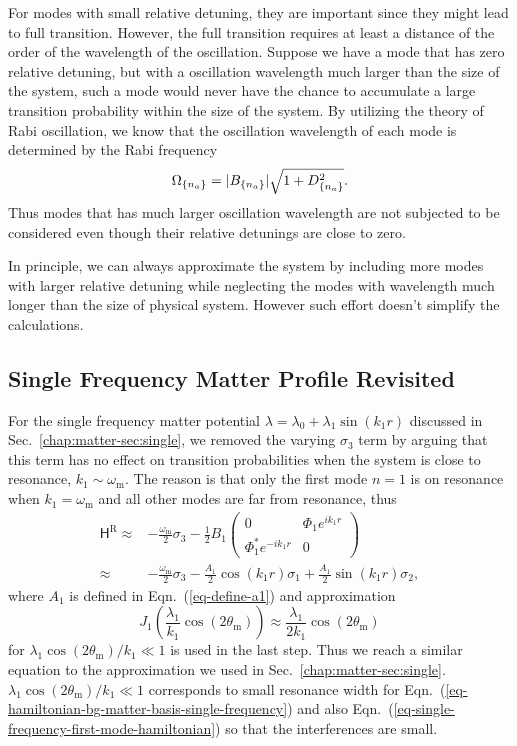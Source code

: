 For modes with small relative detuning, they are important since they might lead to full transition. However, the full transition requires at least a distance of the order of the wavelength of the oscillation. Suppose we have a mode that has zero relative detuning, but with a oscillation wavelength much larger than the size of the system, such a mode would never have the chance to accumulate a large transition probability within the size of the system. By utilizing the theory of Rabi oscillation, we know that the oscillation wavelength of each mode is determined by the Rabi frequency
\begin{equation}
\Omega_{\{n_a\}} = \lvert B_{\{n_a\}} \rvert \sqrt{1+D_{\{n_a\}}^2}.
\end{equation}
Thus modes that has much larger oscillation wavelength are not subjected to be considered even though their relative detunings are close to zero.

In principle, we can always approximate the system by including more modes with larger relative detuning while neglecting the modes with wavelength much longer than the size of physical system. However such effort doesn't simplify the calculations.


\subsection{\label{sec:single-revisted}Single Frequency Matter Profile Revisited}

For the single frequency matter potential $\lambda = \lambda_0 + \lambda_1 \sin(k_1 r)$ discussed in Sec.~\ref{chap:matter-sec:single}, we removed the varying $\sigma_3$ term by arguing that this term has no effect on transition probabilities when the system is close to resonance, $k_1 \sim \omega_{\mathrm m}$. The reason is that only the first mode $n=1$ is on resonance when $k_1=\omega_{\mathrm m}$ and all other modes are far from resonance, thus
\begin{align}
\mathsf H^{\mathrm R} \approx & -\frac{\omega_{\mathrm m}}{2}\sigma_3 - \frac{1}{2} B_1 \begin{pmatrix}
0 & \Phi_1 e^{i k_1 r} \\
\Phi_1^* e^{-ik_1r} & 0
\end{pmatrix}\label{eq-single-frequency-first-mode-hamiltonian} \\
\approx & -\frac{\omega_{\mathrm m}}{2} \sigma_3 - \frac{A_1}{2} \cos(k_1 r) \sigma_1 + \frac{A_1}{2} \sin(k_1 r) \sigma_2\nonumber,
\end{align}
where $A_1$ is defined in Eqn.~(\ref{eq-define-a1}) and approximation
\begin{equation*}
J_1\left( \frac{\lambda_1}{k_1}\cos (2\theta_{\mathrm m}) \right) \approx \frac{\lambda_1}{2k_1}\cos (2\theta_{\mathrm m})
\end{equation*}
for $\lambda_1\cos(2\theta_{\mathrm m})/k_1\ll 1$ is used in the last step. Thus we reach a similar equation to the approximation we used in Sec.~\ref{chap:matter-sec:single}. $\lambda_1\cos(2\theta_{\mathrm m})/k_1\ll 1$ corresponds to small resonance width for Eqn.~(\ref{eq-hamiltonian-bg-matter-basis-single-frequency}) and also Eqn.~(\ref{eq-single-frequency-first-mode-hamiltonian}) so that the interferences are small.



